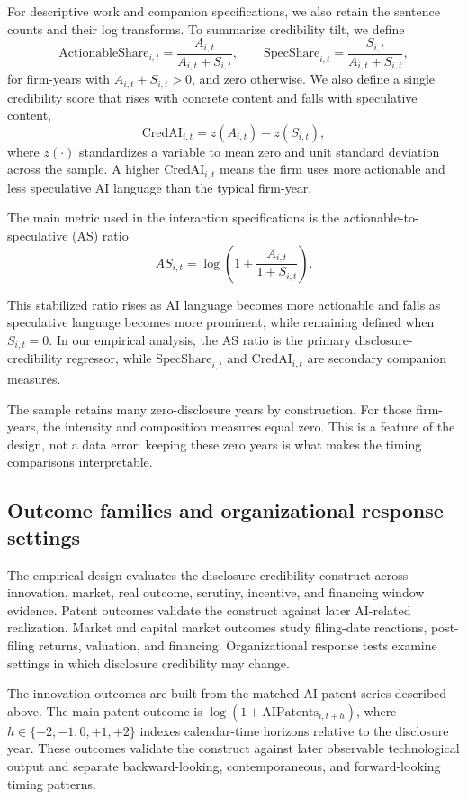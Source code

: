 For descriptive work and companion specifications, we also retain the sentence counts and their log transforms. To summarize credibility tilt, we define
\[
\mathrm{ActionableShare}_{i,t} = \frac{A_{i,t}}{A_{i,t} + S_{i,t}},
\qquad
\mathrm{SpecShare}_{i,t} = \frac{S_{i,t}}{A_{i,t} + S_{i,t}},
\]
for firm-years with $A_{i,t} + S_{i,t} > 0$, and zero otherwise. We also define a single credibility score that rises with concrete content and falls with speculative content,
\[
\mathrm{CredAI}_{i,t} = z(A_{i,t}) - z(S_{i,t}),
\]
where $z(\cdot)$ standardizes a variable to mean zero and unit standard deviation across the sample. A higher $\mathrm{CredAI}_{i,t}$ means the firm uses more actionable and less speculative AI language than the typical firm-year.

The main metric used in the interaction specifications is the actionable-to-speculative (AS) ratio
\[
AS_{i,t} = \log\left(1 + \frac{A_{i,t}}{1 + S_{i,t}}\right).
\]

This stabilized ratio rises as AI language becomes more actionable and falls as speculative language becomes more prominent, while remaining defined when $S_{i,t} = 0$. In our empirical analysis, the AS ratio is the primary disclosure-credibility regressor, while $\mathrm{SpecShare}_{i,t}$ and $\mathrm{CredAI}_{i,t}$ are secondary companion measures.

The sample retains many zero-disclosure years by construction. For those firm-years, the intensity and composition measures equal zero. This is a feature of the design, not a data error: keeping these zero years is what makes the timing comparisons interpretable.

\subsection{Outcome families and organizational response settings}

The empirical design evaluates the disclosure credibility construct across innovation, market, real outcome, scrutiny, incentive, and financing window evidence. Patent outcomes validate the construct against later AI-related realization. Market and capital market outcomes study filing-date reactions, post-filing returns, valuation, and financing. Organizational response tests examine settings in which disclosure credibility may change.

The innovation outcomes are built from the matched AI patent series described above. The main patent outcome is $\log(1+\mathrm{AIPatents}_{i,t+h})$, where $h \in \{-2,-1,0,+1,+2\}$ indexes calendar-time horizons relative to the disclosure year. These outcomes validate the construct against later observable technological output and separate backward-looking, contemporaneous, and forward-looking timing patterns.

